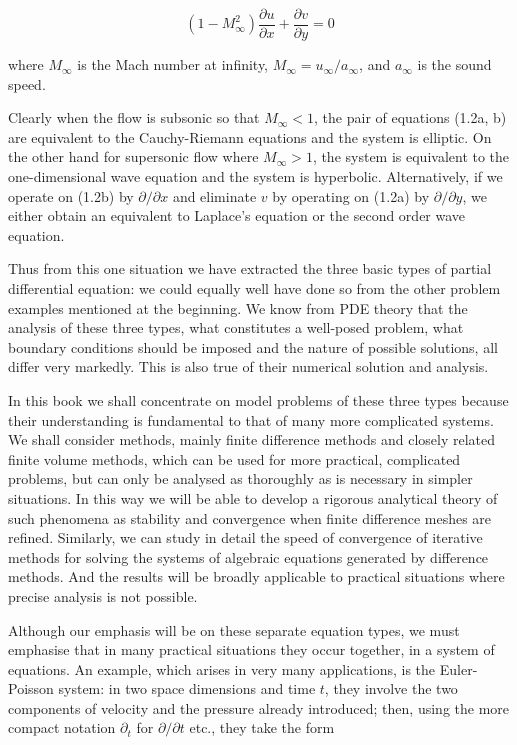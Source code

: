\documentclass[10pt]{article}
\begin{document}
\[
\left(1-M_{\infty}^{2}\right) \frac{\partial u}{\partial x}+\frac{\partial v}{\partial y}=0
\]

where \(M_{\infty}\) is the Mach number at infinity, \(M_{\infty}=u_{\infty} / a_{\infty}\), and \(a_{\infty}\) is the sound speed.

Clearly when the flow is subsonic so that \(M_{\infty}<1\), the pair of equations (1.2a, b) are equivalent to the Cauchy-Riemann equations and the system is elliptic. On the other hand for supersonic flow where \(M_{\infty}>1\), the system is equivalent to the one-dimensional wave equation and the system is hyperbolic. Alternatively, if we operate on (1.2b) by \(\partial / \partial x\) and eliminate \(v\) by operating on (1.2a) by \(\partial / \partial y\), we either obtain an equivalent to Laplace's equation or the second order wave equation.

Thus from this one situation we have extracted the three basic types of partial differential equation: we could equally well have done so from the other problem examples mentioned at the beginning. We know from PDE theory that the analysis of these three types, what constitutes a well-posed problem, what boundary conditions should be imposed and the nature of possible solutions, all differ very markedly. This is also true of their numerical solution and analysis.

In this book we shall concentrate on model problems of these three types because their understanding is fundamental to that of many more complicated systems. We shall consider methods, mainly finite difference methods and closely related finite volume methods, which can be used for more practical, complicated problems, but can only be analysed as thoroughly as is necessary in simpler situations. In this way we will be able to develop a rigorous analytical theory of such phenomena as stability and convergence when finite difference meshes are refined. Similarly, we can study in detail the speed of convergence of iterative methods for solving the systems of algebraic equations generated by difference methods. And the results will be broadly applicable to practical situations where precise analysis is not possible.

Although our emphasis will be on these separate equation types, we must emphasise that in many practical situations they occur together, in a system of equations. An example, which arises in very many applications, is the Euler-Poisson system: in two space dimensions and time \(t\), they involve the two components of velocity and the pressure already introduced; then, using the more compact notation \(\partial_{t}\) for \(\partial / \partial t\) etc., they take the form
\end{document}
